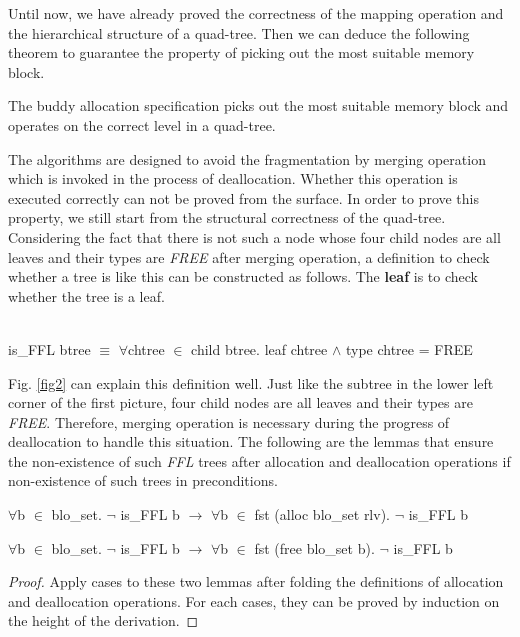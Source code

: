 Until now, we have already proved the correctness of the mapping operation and the hierarchical structure of a quad-tree. Then we can deduce the following theorem to guarantee the property of picking out the most suitable memory block.

\begin{theorem}
	The buddy allocation specification picks out the most suitable memory block and operates on the correct level in a quad-tree.
\end{theorem}

The algorithms are designed to avoid the fragmentation by merging operation which is invoked in the process of deallocation. Whether this operation is executed correctly can not be proved from the surface. In order to prove this property, we still start from the structural correctness of the quad-tree. Considering the fact that there is not such a node whose four child nodes are all leaves and their types are \emph{FREE} after merging operation, a definition to check whether a tree is like this can be constructed as follows. The \textbf{leaf} is to check whether the tree is a leaf.

\begin{definition}  \\
	is\_FFL btree $\equiv$ $\forall$chtree $\in$ child btree. leaf chtree $\wedge$ type chtree = FREE
\end{definition}

Fig. \ref{fig2} can explain this definition well. Just like the subtree in the lower left corner of the first picture, four child nodes are all leaves and their types are \emph{FREE}. Therefore, merging operation is necessary during the progress of deallocation to handle this situation. The following are the lemmas that ensure the non-existence of such \emph{FFL} trees after allocation and deallocation operations if non-existence of such trees in preconditions.

\begin{lemma}
	$\forall$b $\in$ blo\_set. $\neg$ is\_FFL b $\longrightarrow$ $\forall$b $\in$ fst (alloc blo\_set rlv). $\neg$ is\_FFL b
\end{lemma}

\begin{lemma}
	$\forall$b $\in$ blo\_set. $\neg$ is\_FFL b $\longrightarrow$ $\forall$b $\in$ fst (free blo\_set b). $\neg$ is\_FFL b
\end{lemma}

\begin{proof}
	Apply cases to these two lemmas after folding the definitions of allocation and deallocation operations. For each cases, they can be proved by induction on the height of the derivation.
\end{proof}

